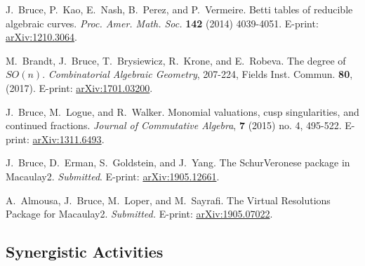\documentclass[11pt]{article}
\begin{document}
\begin{bibenum}[itemsep=5pt]
\item
	J.~Bruce, P.~Kao, E.~Nash, B.~Perez, and P.~Vermeire. Betti tables of reducible algebraic curves. {\it Proc. Amer. Math. Soc.} \textbf{142} (2014) 4039-4051. E-print: \hyperref{http://arxiv.org/abs/1210.3064}{}{}{arXiv:1210.3064}.

\item
	M.~Brandt, J.~Bruce, T.~Brysiewicz, R.~Krone, and E.~Robeva. The degree of $SO(n)$. {\it Combinatorial Algebraic Geometry}, 207-224, Fields Inst. Commun. \textbf{80}, (2017). E-print: \hyperref{https://arxiv.org/abs/1701.03200}{}{}{arXiv:1701.03200}.
	
\item
	J.~Bruce, M.~Logue, and R.~Walker. Monomial valuations, cusp singularities, and continued fractions. {\it Journal of Commutative Algebra}, \textbf{7} (2015) no. 4, 495-522. E-print: \hyperref{http://arxiv.org/abs/1311.6493}{}{}{arXiv:1311.6493}.
	
\item
	J.~Bruce, D.~Erman, S.~Goldstein, and J.~Yang. The SchurVeronese package in Macaulay2.  {\it Submitted}. E-print: \hyperref{https://arxiv.org/abs/1905.12661}{}{}{arXiv:1905.12661}.
	
\item
	A.~Almousa, J.~Bruce, M.~Loper, and M.~Sayrafi. The Virtual Resolutions Package for Macaulay2.  {\it Submitted.} E-print: \hyperref{http://arxiv.org/abs/1905.07022}{}{}{arXiv:1905.07022}.
	
\end{bibenum}



\subsection{Synergistic Activities}
\end{document}
